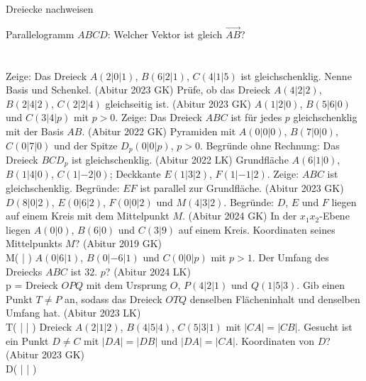 \setcounter{aufgabe}{14}

\begin{aufgabe}{Dreiecke nachweisen}
\begin{teile}
\teil Parallelogramm $ABCD$: Welcher Vektor ist gleich $\overrightarrow{AB}$? \\  \\  \\ 
\teil Zeige: Das Dreieck $A(2 | 0 | 1)$, $B(6 | 2 | 1)$, $C(4 | 1 | 5)$ ist gleichschenklig. Nenne Basis und Schenkel. \hfill (Abitur 2023 GK)
\teil Prüfe, ob das Dreieck $A(4 | 2 | 2)$, $B(2 | 4 | 2)$, $C(2 | 2 | 4)$ gleichseitig ist. \hfill (Abitur 2023 GK)
\teil $A(1 | 2 | 0)$, $B(5 | 6 | 0)$ und $C(3 | 4 | p)$ mit $p > 0$. Zeige: Das Dreieck $ABC$ ist für jedes $p$ gleichschenklig mit der Basis $AB$. \hfill (Abitur 2022 GK)
\teil Pyramiden mit $A(0 | 0 | 0)$, $B(7 | 0 | 0)$, $C(0 | 7 | 0)$ und der Spitze $D_p(0 | 0 | p)$, $p > 0$. Begründe ohne Rechnung: Das Dreieck $BCD_p$ ist gleichschenklig. \hfill (Abitur 2022 LK)
\teil Grundfläche $A(6 | 1 | 0)$, $B(1 | 4 | 0)$, $C(1 | -2 | 0)$; Deckkante $E(1 | 3 | 2)$, $F(1 | -1 | 2)$. Zeige: $ABC$ ist gleichschenklig. Begründe: $EF$ ist parallel zur Grundfläche. \hfill (Abitur 2023 GK)
\teil $D(8 | 0 | 2)$, $E(0 | 6 | 2)$, $F(0 | 0 | 2)$ und $M(4 | 3 | 2)$. Begründe: $D$, $E$ und $F$ liegen auf einem Kreis mit dem Mittelpunkt $M$. \hfill (Abitur 2024 GK)
\teil In der $x_1x_2$-Ebene liegen $A(0 | 0)$, $B(6 | 0)$ und $C(3 | 9)$ auf einem Kreis. Koordinaten seines Mittelpunkts $M$? \hfill (Abitur 2019 GK) \\ M( \leerfeld | \leerfeld )
\teil $A(0 | 6 | 1)$, $B(0 | -6 | 1)$ und $C(0 | 0 | p)$ mit $p > 1$. Der Umfang des Dreiecks $ABC$ ist $32$. $p$? \hfill (Abitur 2024 LK) \\ p = \leerfeld
\teil Dreieck $OPQ$ mit dem Ursprung $O$, $P(4 | 2 | 1)$ und $Q(1 | 5 | 3)$. Gib einen Punkt $T \ne P$ an, sodass das Dreieck $OTQ$ denselben Flächeninhalt und denselben Umfang hat. \hfill (Abitur 2023 LK) \\ T( \leerfeld | \leerfeld | \leerfeld )
\teil Dreieck $A(2 | 1 | 2)$, $B(4 | 5 | 4)$, $C(5 | 3 | 1)$ mit $|CA| = |CB|$. Gesucht ist ein Punkt $D \ne C$ mit $|DA| = |DB|$ und $|DA| = |CA|$. Koordinaten von $D$? \hfill (Abitur 2023 GK) \\ D( \leerfeld | \leerfeld | \leerfeld )
\end{teile}
\end{aufgabe}

